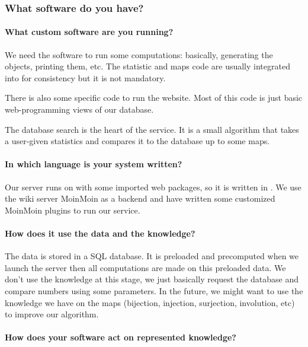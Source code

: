 \subsubsection{What software do you have?}
 \paragraph{What custom software are you running?}

We need the software \SageMath to run some computations: basically, generating the objects, printing them, etc. The statistic and maps code are usually integrated into \SageMath for consistency but it is not mandatory.

There is also some \FindStat specific code to run the website. Most of this code is just basic web-programming views of our database.

The database search is the heart of the service. It is a small algorithm that takes a user-given statistics and compares it to the database up to some maps.

\paragraph{In which language is your system written?}

Our server runs on \SageMath with some imported web packages, so it is written in \python. We use the \python wiki server \textsf{MoinMoin} as a backend and have written some customized \textsf{MoinMoin} plugins to run our service.

 \paragraph{How does it use the data and the knowledge?}

The data is stored in a SQL database. It is preloaded and precomputed when we launch the server then all computations are made on this preloaded data. We don't use the knowledge at this stage, we just basically request the database and compare numbers using some parameters. In the future, we might want to  use the knowledge we have on the maps (bijection, injection, surjection, involution, etc) to improve our algorithm.

\paragraph{How does your software act on represented knowledge?}

